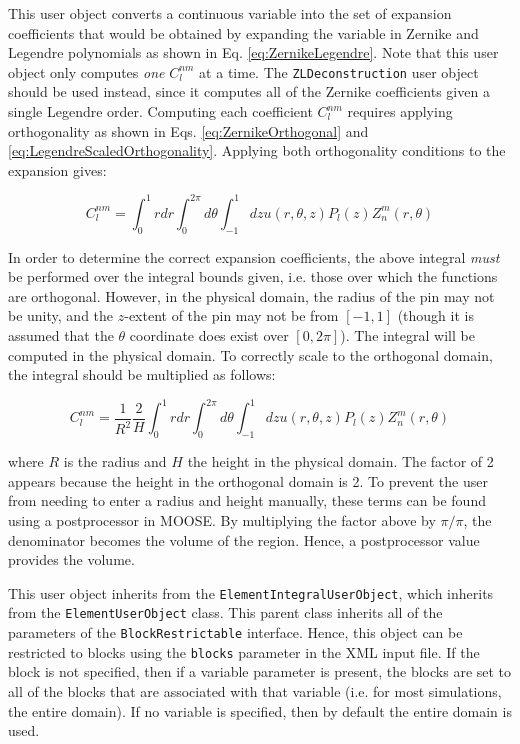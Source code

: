 \documentclass[10pt]{article}
\newcommand{\beq}{\begin{equation}}
\newcommand{\eeq}{\end{equation}}
\newcounter{subsubsubsection}[subsubsection]
\numberwithin{equation}{section} %
\begin{document}
This user object converts a continuous variable into the set of expansion coefficients that would be obtained by expanding the variable in Zernike and Legendre polynomials as shown in Eq. \eqref{eq:ZernikeLegendre}. Note that this user object only computes {\it one} \(C_l^{nm}\) at a time. The {\tt ZLDeconstruction} user object should be used instead, since it computes all of the Zernike coefficients given a single Legendre order. Computing each coefficient \(C_{l}^{nm}\) requires applying orthogonality as shown in Eqs. \eqref{eq:ZernikeOrthogonal} and \eqref{eq:LegendreScaledOrthogonality}. Applying both orthogonality conditions to the expansion gives:

\beq
C_l^{nm}=\int_0^1rdr\int_{0}^{2\pi}d\theta\int_{-1}^{1}dzu(r,\theta,z)P_l(z)Z_n^m(r,\theta)
\eeq

In order to determine the correct expansion coefficients, the above integral {\it must} be performed over the integral bounds given, i.e. those over which the functions are orthogonal. However, in the physical domain, the radius of the pin may not be unity, and the \(z\)-extent of the pin may not be from \([-1, 1]\) (though it is assumed that the \(\theta\) coordinate does exist over \([0,2\pi]\)). The integral will be computed in the physical domain. To correctly scale to the orthogonal domain, the integral should be multiplied as follows:

\beq
C_l^{nm}=\frac{1}{R^2}\frac{2}{H}\int_0^1rdr\int_{0}^{2\pi}d\theta\int_{-1}^{1}dzu(r,\theta,z)P_l(z)Z_n^m(r,\theta)
\eeq

where \(R\) is the radius and \(H\) the height in the physical domain. The factor of 2 appears because the height in the orthogonal domain is 2. To prevent the user from needing to enter a radius and height manually, these terms can be found using a postprocessor in MOOSE. By multiplying the factor above by \(\pi/\pi\), the denominator becomes the volume of the region. Hence, a postprocessor value provides the volume.

This user object inherits from the {\tt ElementIntegralUserObject}, which inherits from the {\tt ElementUserObject} class. This parent class inherits all of the parameters of the {\tt BlockRestrictable} interface. Hence, this object can be restricted to blocks using the {\tt blocks} parameter in the XML input file. If the block is not specified, then if a variable parameter is present, the blocks are set to all of the blocks that are associated with that variable (i.e. for most simulations, the entire domain). If no variable is specified, then by default the entire domain is used. 
\end{document}
